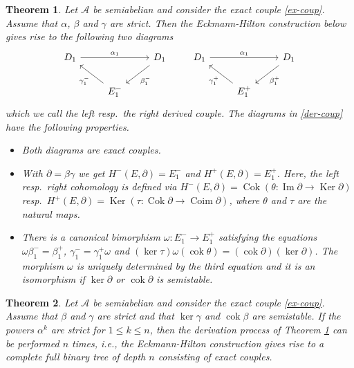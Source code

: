 \documentclass[a4paper,10pt,reqno]{amsart}
\newtheorem{thm}{Theorem}[section]
\newcommand{\Ker}{\operatorname{Ker}\nolimits}
\newcommand{\Cok}{\operatorname{Cok}\nolimits}
\newcommand{\cok}{\operatorname{cok}\nolimits}
\renewcommand{\Im}{\operatorname{Im}\nolimits}
\newcommand{\Coim}{\operatorname{Coim}\nolimits}
\begin{document}
	\begin{thm}\label{THM-1}\cite[Theorem 1.]{KW2} Let $\mathcal{A}$ be semiabelian and consider the exact couple \eqref{ex-coup}. Assume that $\alpha$, $\beta$ and $\gamma$ are strict. Then the Eckmann-Hilton construction below gives rise to the following two diagrams
		\begin{equation}\label{der-coup}
			\begin{tikzcd}
				D_1 \arrow[]{rr}{\alpha_1}& &D_1 \arrow[]{ld}{\beta_1^-}\\
				&E_1^- \arrow[]{ul}{\gamma_1^-}
			\end{tikzcd}\hspace{20pt}
			\begin{tikzcd}
				D_1 \arrow[]{rr}{\alpha_1}& &D_1 \arrow[]{ld}{\beta_1^+}\\
				&E_1^+ \arrow[]{ul}{\gamma_1^+}
			\end{tikzcd}
		\end{equation}
		which we call the \emph{left} resp.~the \emph{right derived couple}. The diagrams in \eqref{der-coup} have the following properties.\vspace{3pt}
		
		\begin{itemize}
			\item[(i)] Both diagrams are exact couples.
			
			\item[(ii)] With $\partial=\beta\gamma$ we get $H^-(E,\partial)=E_1^-$ and $H^+(E,\partial)=E_1^+$. Here, the \emph{left} resp.~\emph{right cohomology} is defined via $H^-(E,\partial)=\Cok(\theta\colon\Im\partial\rightarrow\Ker\partial)$ resp.~$H^+(E,\partial)=\Ker(\tau\colon\Cok\partial\rightarrow\Coim\partial)$, where $\theta$ and $\tau$ are the natural maps.
			
			\item[(iii)] There is a canonical bimorphism $\omega\colon E_1^-\rightarrow E_1^+$ satisfying the equations $\omega\beta_1^-=\beta_1^+$, $\gamma_1^-=\gamma_1^+\omega$ and $(\ker\tau)\omega(\cok\theta)=(\cok\partial)(\ker\partial)$. The morphism $\omega$ is uniquely determined by the third equation and it is an isomorphism if $\ker\partial$ or $\cok\partial$ is semistable.
		\end{itemize}
	\end{thm}
	
	\begin{thm}\label{THM-2}\cite[Theorem 2.]{KW2} Let $\mathcal{A}$ be semiabelian and consider the exact couple \eqref{ex-coup}. Assume that $\beta$ and $\gamma$ are strict and that $\ker\gamma$ and $\cok\beta$ are semistable. If the powers $\alpha^k$ are strict for $1\leqslant{}k\leqslant{}n$, then the derivation process of Theorem \ref{THM-1} can be performed $n$ times, i.e., the Eckmann-Hilton construction gives rise to a complete full binary tree of depth $n$ consisting of exact couples.
	\end{thm}
	
\end{document}
